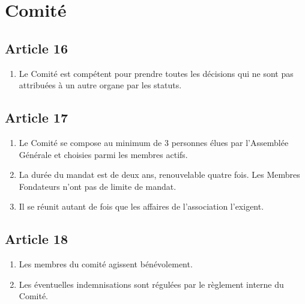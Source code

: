 \documentclass[12pt,twoside]{report}
\begin{document}
\section*{Comité}

\subsection*{Article 16}
\begin{enumerate}
\item Le Comité est compétent pour prendre toutes les décisions qui ne sont pas attribuées à un autre organe par les statuts.
\end{enumerate}

\subsection*{Article 17}
\begin{enumerate}
\item Le Comité se compose au minimum de 3 personnes élues par l’Assemblée Générale et choisies parmi les membres actifs.

\item La durée du mandat est de deux ans, renouvelable quatre fois. Les Membres Fondateurs n’ont pas de limite de mandat.

\item Il se réunit autant de fois que les affaires de l'association l'exigent.
\end{enumerate}

\subsection*{Article 18}
\begin{enumerate}
\item Les membres du comité agissent bénévolement.

\item Les éventuelles indemnisations sont régulées par le règlement interne du Comité.
\end{enumerate}
\end{document}
